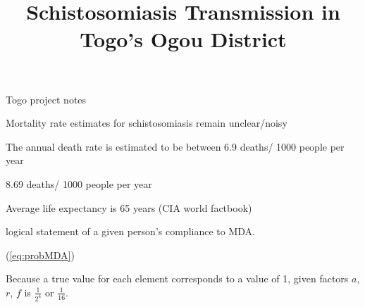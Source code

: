 \documentclass[12pt]{article}
\begin{document}
\title{Schistosomiasis Transmission in Togo's Ogou District}
Togo project notes

Mortality rate estimates for schistosomiasis remain unclear/noisy

The annual death rate is estimated to be between 6.9 deaths/ 1000 people per year

                                                                             8.69 deaths/ 1000 people per year

Average life expectancy is 65 years (CIA world factbook)


 
 
 
 



logical statement of a given person's compliance to MDA. 

(\ref{eq:probMDA})


Because a true value for each element corresponds to a value of 1,
  given factors $a$, $r$, $f$ is $\frac{1}{2^4}$ or $\frac{1}{16}$.
\linebreak
\end{document}
